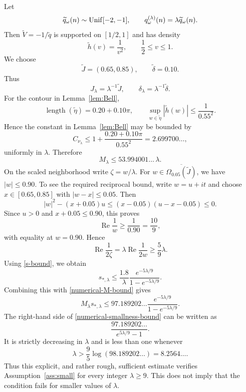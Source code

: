 \documentclass[12pt,a4paper]{article}
\numberwithin{equation}{section}
\newcommand{\Om}{\Omega}
\renewcommand{\Re}{\operatorname{Re}}
\begin{document}
Let
$$
\widetilde q_\omega(n)\sim {\rm Unif}[-2,-1],\qquad
q_\omega^{(\lambda)}(n)=\lambda\widetilde q_\omega(n).
$$
Then $\widetilde V=-1/\widetilde q$ is supported on $[1/2,1]$ and has density
$$
\widetilde h(v)=\frac{1}{v^2},\qquad \frac12\le v\le1.
$$
We choose
$$
\widetilde J=(0.65,0.85),\qquad
\widetilde\delta=0.10.
$$
Thus
$$
J_\lambda=\lambda^{-1}\widetilde J,\qquad
\delta_\lambda=\lambda^{-1}\widetilde\delta.
$$
%
For the contour in Lemma~\ref{lem:Bell},
$$
\operatorname{length}(\widetilde\eta)=0.20+0.10\pi,\qquad
\sup_{w\in\widetilde\eta}|\widetilde h(w)|\le \frac{1}{0.55^2}.
$$
Hence the constant in Lemma~\ref{lem:Bell} may be bounded by
$$
C_{\nu_\lambda}\le 1+\frac{0.20+0.10\pi}{0.55^2}=2.699700\ldots,
$$
uniformly in $\lambda$.  Therefore
\begin{equation}
M_\lambda\le 53.994001\ldots\,\lambda.
\label{numerical-M-bound}
\end{equation}
%
On the scaled neighborhood write $\zeta=w/\lambda$.  For $w\in\overline{\Om_{0.05}(\widetilde J)}$, we have $|w|\le0.90$.  To see the required reciprocal bound, write
$w=u+it$ and choose $x\in[0.65,0.85]$ with $|w-x|\le0.05$.
Then
$$
 |w|^2-(x+0.05)u
 \le (x-0.05)(u-x-0.05)\le0.
$$
Since $u>0$ and $x+0.05\le0.90$, this proves
$$
\Re\frac{1}{w}\ge\frac{1}{0.90}=\frac{10}{9},
$$
with equality at $w=0.90$.  Hence
$$
\Re\frac{1}{2\zeta}
=\lambda\Re\frac{1}{2w}
\ge\frac{5}{9}\lambda.
$$
Using \eqref{s-bound}, we obtain
\begin{equation}
s_{*,\lambda}\le \frac{1.8}{\lambda}
\frac{e^{-5\lambda/9}}{1-e^{-5\lambda/9}}.
\label{numerical-s-bound}
\end{equation}
Combining this with \eqref{numerical-M-bound} gives
\begin{equation}
M_\lambda s_{*,\lambda}\le 97.189202\ldots
\frac{e^{-5\lambda/9}}{1-e^{-5\lambda/9}}.
\label{numerical-smallness-bound}
\end{equation}
%
The right-hand side of \eqref{numerical-smallness-bound} can be written as
$$
\frac{97.189202\ldots}{e^{5\lambda/9}-1}.
$$
It is strictly decreasing in $\lambda$ and is less than one whenever
$$
\lambda>\frac{9}{5}\log(98.189202\ldots)=8.2564\ldots .
$$
Thus this explicit, and rather rough, sufficient estimate verifies Assumption~\ref{ass:small} for every integer $\lambda\ge9$.  This does not imply that the condition fails for smaller values of $\lambda$.
\end{document}
